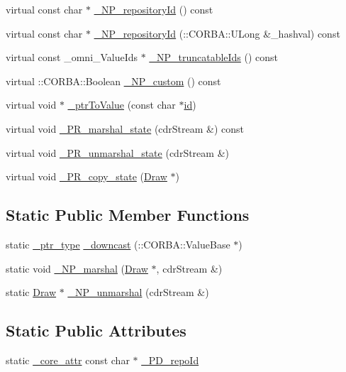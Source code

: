 \begin{DoxyCompactItemize}
\item 
virtual const char $\ast$ \hyperlink{class_draw_a90d2c0a9b6aed68ca30ea2a7187317dc}{\+\_\+\+N\+P\+\_\+repository\+Id} () const 
\item 
virtual const char $\ast$ \hyperlink{class_draw_ae24df04b0f119c2fb6fd525a041f081d}{\+\_\+\+N\+P\+\_\+repository\+Id} (\+::C\+O\+R\+B\+A\+::\+U\+Long \&\+\_\+hashval) const 
\item 
virtual const \+\_\+omni\+\_\+\+Value\+Ids $\ast$ \hyperlink{class_draw_a10a319bcb2ef5d6ac5439859fe9f126e}{\+\_\+\+N\+P\+\_\+truncatable\+Ids} () const 
\item 
virtual \+::C\+O\+R\+B\+A\+::\+Boolean \hyperlink{class_draw_aab5e3083274138f65200f2516df70510}{\+\_\+\+N\+P\+\_\+custom} () const 
\item 
virtual void $\ast$ \hyperlink{class_draw_a2924173c6238dd077531f555324155b9}{\+\_\+ptr\+To\+Value} (const char $\ast$\hyperlink{class_draw_a50509da989141b00a5ae22d68a4d5856}{id})
\item 
virtual void \hyperlink{class_draw_adfa1e0ac94bad822e332caeddc17f02a}{\+\_\+\+P\+R\+\_\+marshal\+\_\+state} (cdr\+Stream \&) const 
\item 
virtual void \hyperlink{class_draw_a62dc59ec12f9ebd4da1f3448dbec683f}{\+\_\+\+P\+R\+\_\+unmarshal\+\_\+state} (cdr\+Stream \&)
\item 
virtual void \hyperlink{class_draw_a5832713920beeb0d47ef83caf919f185}{\+\_\+\+P\+R\+\_\+copy\+\_\+state} (\hyperlink{class_draw}{Draw} $\ast$)
\end{DoxyCompactItemize}
\subsection*{Static Public Member Functions}
\begin{DoxyCompactItemize}
\item 
static \hyperlink{class_draw_a5164256572b3c4123ceecd1897c248dd}{\+\_\+ptr\+\_\+type} \hyperlink{class_draw_adf5095556588059f6a3c1663e84e46c0}{\+\_\+downcast} (\+::C\+O\+R\+B\+A\+::\+Value\+Base $\ast$)
\item 
static void \hyperlink{class_draw_aa95f9c6dc4ba6f6d3477fc6432180594}{\+\_\+\+N\+P\+\_\+marshal} (\hyperlink{class_draw}{Draw} $\ast$, cdr\+Stream \&)
\item 
static \hyperlink{class_draw}{Draw} $\ast$ \hyperlink{class_draw_a3c3a65725a77c521aca9582928f5b298}{\+\_\+\+N\+P\+\_\+unmarshal} (cdr\+Stream \&)
\end{DoxyCompactItemize}
\subsection*{Static Public Attributes}
\begin{DoxyCompactItemize}
\item 
static \hyperlink{_petit_prince_8hpp_a5f7bf7cddb608c2aad7c95f55f8a33c5}{\+\_\+core\+\_\+attr} const char $\ast$ \hyperlink{class_draw_aa81c5a904a215524ca32f588126783bc}{\+\_\+\+P\+D\+\_\+repo\+Id}
\end{DoxyCompactItemize}
